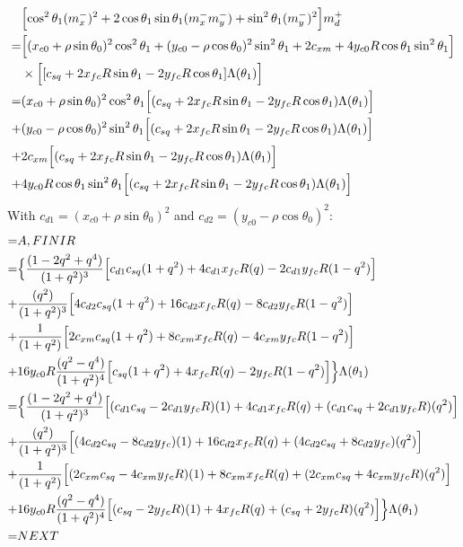 \documentclass[12pt]{article}
\begin{document}
\begin{align}
    &\Bigl[\cos^2\theta_1(m_x^-)^2 + 2\cos\theta_1\sin\theta_1 (m_x^-m_y^-)  + \sin^2\theta_1(m_y^-)^2 \Bigr] m_d^+ \\
    =& \Bigl[ (x_{c0}+\rho\sin\theta_0)^2\cos^2\theta_1 +  (y_{c0}- \rho\cos\theta_0)^2\sin^2\theta_1 + 2c_{xm} + 4y_{c0}R\cos\theta_1\sin^2\theta_1 \Bigr]\nonumber\\
    &\times\Bigl[ [c_{sq} +2x_{fc}R\sin\theta_1  -2y_{fc}R\cos\theta_1]\Lambda(\theta_1) \Bigr]\\
    =& (x_{c0}+\rho\sin\theta_0)^2\cos^2\theta_1\Bigl[ (c_{sq} +2x_{fc}R\sin\theta_1  -2y_{fc}R\cos\theta_1)\Lambda(\theta_1) \Bigr] \nonumber\\
    +& (y_{c0}- \rho\cos\theta_0)^2\sin^2\theta_1\Bigl[ (c_{sq} +2x_{fc}R\sin\theta_1  -2y_{fc}R\cos\theta_1)\Lambda(\theta_1) \Bigr] \nonumber\\
    +& 2c_{xm}\Bigl[ (c_{sq} +2x_{fc}R\sin\theta_1  -2y_{fc}R\cos\theta_1)\Lambda(\theta_1) \Big]\nonumber \\
    +& 4y_{c0}R\cos\theta_1\sin^2\theta_1\Bigl[ (c_{sq} +2x_{fc}R\sin\theta_1  -2y_{fc}R\cos\theta_1)\Lambda(\theta_1) \Big]\\
\end{align}
With $c_{d1}=(x_{c0}+\rho\sin\theta_0)^2$ and $c_{d2}=(y_{c0}- \rho\cos\theta_0)^2$:
\begin{align}
    =& A, FINIR\\
    =& \Bigl\{ \frac{(1-2q^2+q^4)}{(1+q^2)^3}\Bigl[ c_{d1}c_{sq}(1+q^2) +4c_{d1}x_{fc}R(q)  -2c_{d1}y_{fc}R(1-q^2) \Bigr] \nonumber\\
    +& \frac{(q^2)}{(1+q^2)^3}\Bigl[ 4c_{d2}c_{sq}(1+q^2) +16c_{d2}x_{fc}R(q)  -8c_{d2}y_{fc}R(1-q^2) \Bigr]  \nonumber\\
    +& \frac{1}{(1+q^2)} \Bigl[ 2c_{xm}c_{sq}(1+q^2) +8c_{xm}x_{fc}R(q)  -4c_{xm}y_{fc}R(1-q^2) \Big] \nonumber \\
    +& 16y_{c0}R\frac{(q^2-q^4)}{(1+q^2)^4}\Bigl[ c_{sq}(1+q^2) +4x_{fc}R(q)  -2y_{fc}R(1-q^2) \Big] \Bigr\}\Lambda(\theta_1)\\
    =& \Bigl\{ \frac{(1-2q^2+q^4)}{(1+q^2)^3}\Bigl[ (c_{d1}c_{sq} -2c_{d1}y_{fc}R)(1) +4c_{d1}x_{fc}R(q)  +(c_{d1}c_{sq} +2c_{d1}y_{fc}R)(q^2) \Bigr] \nonumber\\
    +& \frac{(q^2)}{(1+q^2)^3}\Bigl[ (4c_{d2}c_{sq} -8c_{d2}y_{fc})(1) +16c_{d2}x_{fc}R(q)  +(4c_{d2}c_{sq} +8c_{d2}y_{fc})(q^2) \Bigr]  \nonumber\\
    +& \frac{1}{(1+q^2)} \Bigl[ (2c_{xm}c_{sq} -4c_{xm}y_{fc}R )(1) + 8c_{xm}x_{fc}R(q)  +(2c_{xm}c_{sq}+ 4c_{xm}y_{fc}R)(q^2) \Big] \nonumber \\
    +& 16y_{c0}R\frac{(q^2-q^4)}{(1+q^2)^4}\Bigl[ (c_{sq}-2y_{fc}R)(1) +4x_{fc}R(q)  + (c_{sq} + 2y_{fc}R)(q^2) \Big] \Bigr\}\Lambda(\theta_1)\\
    =& NEXT
\end{align}
\end{document}
